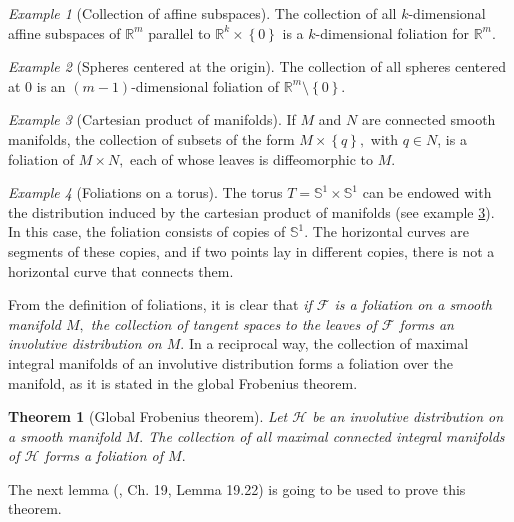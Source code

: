 \documentclass[12pt, letterpaper, reqno]{amsart}
\theoremstyle{definition}
\theoremstyle{plain}
\newtheorem{thm}{Theorem}
\theoremstyle{remark}
\newtheorem{ex}{Example}
\begin{document}
\begin{ex}[Collection of affine subspaces]
	The collection of all $ k $-dimensional affine subspaces of $ \mathbb{R}^m $ parallel to $ \mathbb{R}^k\times \left\{ 0 \right\} $ is a $ k $-dimensional foliation for $ \mathbb{R}^m. $ 
\end{ex}

\begin{ex}[Spheres centered at the origin]
	The collection of all spheres centered at $ 0 $ is an $ (m-1) $-dimensional foliation of $ \mathbb{R}^m\setminus \left\{ 0 \right\} $. 
\end{ex}

\begin{ex}[Cartesian product of manifolds]\label{ex:product_foliation}
	If $ M $ and $ N $ are connected smooth manifolds, the collection of subsets of the form $ M\times \left\{ q \right\}, $ with $ q\in N $, is a foliation of $ M\times N, $ each of whose leaves is diffeomorphic to $ M. $  	
\end{ex}

\begin{ex}[Foliations on a torus]
	The torus $ T= \mathbb{S}^1\times \mathbb{S}^1 $ can be endowed with the distribution induced by the cartesian product of manifolds (see example \ref{ex:product_foliation}). In this case, the foliation consists of copies of $ \mathbb{S}^1. $ The horizontal curves are segments of these copies, and if two points lay in different copies, there is not a horizontal curve that connects them.
\end{ex}

From the definition of foliations, it is clear that \textit{if $ \mathcal{F} $ is a foliation on a smooth manifold $ M, $ the collection of tangent spaces to the leaves of $ \mathcal{F} $ forms an involutive distribution on $ M. $} In a reciprocal way, the collection of maximal integral manifolds of an involutive distribution forms a foliation over the manifold, as it is stated in the global Frobenius theorem.

\begin{thm}[Global Frobenius theorem]
	Let $ \mathcal{H} $ be an involutive distribution on a smooth manifold $ M. $ The collection of all maximal connected integral manifolds of $ \mathcal{H} $ forms a foliation of $ M. $ 
\end{thm}

The next lemma (\cite{lee2003introduction}, Ch. 19, Lemma 19.22) is going to be used to prove this theorem.
\end{document}
